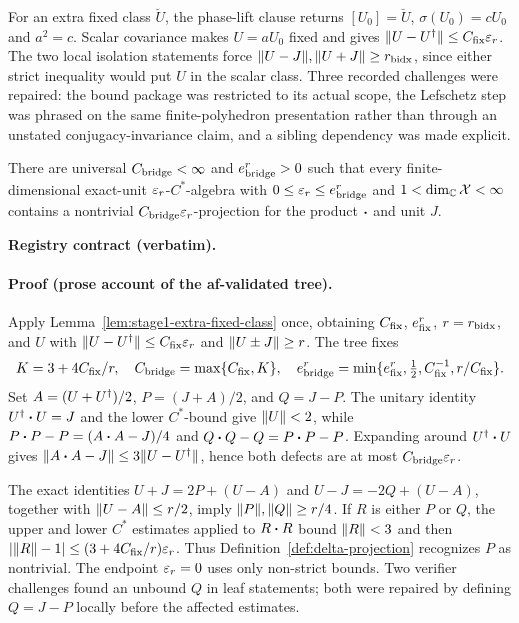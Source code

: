 For an extra fixed class $\breve U$, the phase-lift clause returns
$[U_0]=\breve U$, $\sigma(U_0)=cU_0$ and $a^2=c$.  Scalar covariance makes
$U=aU_0$ fixed and gives $\lVert U-U^{\dagger}\rVert\le C_{\rm fix}\varepsilon_r$.  The two local isolation
statements force $\lVert U-J\rVert,\lVert U+J\rVert\ge r_{\rm bidx}$, since either strict inequality
would put $U$ in the scalar class.  Three recorded challenges were repaired: the bound
package was restricted to its actual scope, the Lefschetz step was phrased on the same
finite-polyhedron presentation rather than through an unstated conjugacy-invariance
claim, and a sibling dependency was made explicit.

\begin{lemma}\label{lem:stage1-fixed-unitary-projection-bridge}
There are universal $C_{\rm bridge}<\infty$ and $e_{\rm bridge}^r>0$ such that every
finite-dimensional exact-unit $\varepsilon_r$-$C^*$-algebra with
$0\le\varepsilon_r\le e_{\rm bridge}^r$ and $1<\dim_{\mathbb C}\mathcal X<\infty$ contains a
nontrivial $C_{\rm bridge}\varepsilon_r$-projection for the product $\mathbin{\bm{\cdot}}$ and unit $J$.
\end{lemma}

\noindent\textbf{Registry contract (verbatim).} 

\paragraph{Proof (prose account of the af-validated tree).}
Apply Lemma~\ref{lem:stage1-extra-fixed-class} once, obtaining $C_{\rm fix}$,
$e_{\rm fix}^r$, $r=r_{\rm bidx}$, and $U$ with
$\lVert U-U^{\dagger}\rVert\le C_{\rm fix}\varepsilon_r$ and $\lVert U\pm J\rVert\ge r$.  The tree fixes
\[
 K=3+4C_{\rm fix}/r,\quad C_{\rm bridge}=\max\{C_{\rm fix},K\},\quad
 e_{\rm bridge}^r=\min\{e_{\rm fix}^r,\tfrac12,C_{\rm fix}^{-1},r/C_{\rm fix}\}.
\]
Set $A=(U+U^{\dagger})/2$, $P=(J+A)/2$, and $Q=J-P$.  The unitary identity
$U^{\dagger}\mathbin{\bm{\cdot}} U=J$ and the lower $C^*$-bound give $\lVert U\rVert<2$, while
$P\mathbin{\bm{\cdot}} P-P=(A\mathbin{\bm{\cdot}} A-J)/4$ and $Q\mathbin{\bm{\cdot}} Q-Q=P\mathbin{\bm{\cdot}} P-P$.  Expanding around
$U^{\dagger}\mathbin{\bm{\cdot}} U$ gives $\lVert A\mathbin{\bm{\cdot}} A-J\rVert\le3\lVert U-U^{\dagger}\rVert$, hence both defects are
at most $C_{\rm bridge}\varepsilon_r$.

The exact identities $U+J=2P+(U-A)$ and $U-J=-2Q+(U-A)$, together with
$\lVert U-A\rVert\le r/2$, imply $\lVert P\rVert,\lVert Q\rVert\ge r/4$.  If $R$ is either $P$ or $Q$, the
upper and lower $C^*$ estimates applied to $R\mathbin{\bm{\cdot}} R$ bound $\lVert R\rVert<3$ and then
$|\lVert R\rVert-1|\le(3+4C_{\rm fix}/r)\varepsilon_r$.  Thus Definition~\ref{def:delta-projection}
recognizes $P$ as nontrivial.  The endpoint $\varepsilon_r=0$ uses only non-strict bounds.
Two verifier challenges found an unbound $Q$ in leaf statements; both were repaired by
defining $Q=J-P$ locally before the affected estimates.

